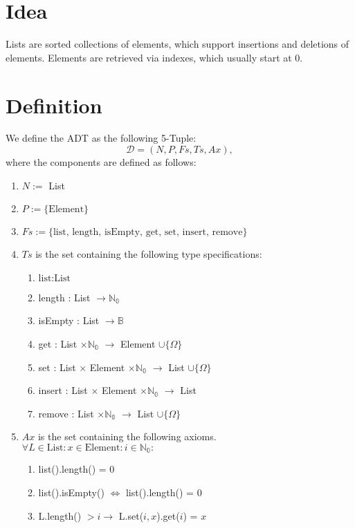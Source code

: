\documentclass{article}
\begin{document}
\section*{Idea}
Lists are sorted collections of elements, which support insertions and deletions of elements. Elements are retrieved via indexes, which usually start at 0.


\section*{Definition}
We define the ADT as the following 5-Tuple:
\[\mathcal{D} = (N, P, Fs, Ts, Ax),\]
where the components are defined as follows:

\begin{enumerate}
 \item \(N :=\) List
 \item \(P := \{ \text{Element} \}\)
 \item \(Fs := \{ \text{list, length, isEmpty, get, set, insert, remove} \}\)
 \item \(Ts\) is the set containing the following type specifications:
	\begin{enumerate}
		\item \( \text{list} : \text{List} \)
		\item length : List \(\rightarrow \mathbb{N_0}\)
		\item isEmpty : List \(\rightarrow \mathbb{B}\)
		\item get : List \(\times \mathbb{N_0}\) \(\rightarrow\) Element \(\cup \{\Omega\}\)
		\item set : List \(\times\) Element \(\times \mathbb{N_0}\) \(\rightarrow\) List \(\cup \{\Omega\}\)
		\item insert : List \(\times\) Element \(\times \mathbb{N_0}\) \(\rightarrow\) List
		\item remove : List \(\times \mathbb{N_0}\) \(\rightarrow\) List \(\cup \{\Omega\}\)
	\end{enumerate}
 \item \(Ax\) is the set containing the following axioms. \\
	\(\forall L \in \text{List} : x \in \text{Element} : i \in \mathbb{N_0} :\)
	\begin{enumerate}
		\item list().length() = 0
  \item list().isEmpty() \(\iff\) list().length() = 0
  \item L.length() \(> i \rightarrow\) L.set(\(i, x\)).get(\(i\)) = \(x\)

\end{enumerate}
\end{enumerate}
\end{document}
